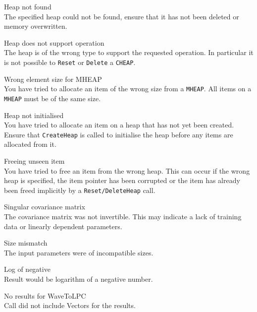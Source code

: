\begin{itemize}
\begin{itemize}
    Heap not found\\
        The specified heap could not be found, ensure that it has not been 
        deleted or memory overwritten.

    Heap does not support operation\\
        The heap is of the wrong type to support the requested operation.  In 
        particular it is not possible to \texttt{Reset} or \texttt{Delete} a
        \texttt{CHEAP}.

    Wrong element size for MHEAP\\
        You have tried to allocate an item of the wrong size from a 
        \texttt{MHEAP}. All items on a \texttt{MHEAP} must be of the same size.

    Heap not initialised\\
        You have tried to allocate an item on a heap that has not yet been 
        created.  Ensure that \texttt{CreateHeap} is called to initialise 
        the heap before any items are allocated from it.

    Freeing unseen item\\
        You have tried to free an item from the wrong heap.  This can occur
        if the wrong heap is specified, the item pointer has been corrupted 
        or the item has already been freed implicitly by a 
        \texttt{Reset/DeleteHeap} call.  

\end{itemize}
 
 
\begin{itemize}
    Singular covariance matrix\\
        The covariance matrix was not invertible.  This may indicate a lack
        of training data or linearly dependent parameters.

    Size mismatch\\
        The input parameters were of incompatible sizes.

    Log of negative\\
        Result would be logarithm of a negative number.

\end{itemize}


\begin{itemize}
    No results for WaveToLPC\\
        Call did not include Vectors for the results.


\end{itemize}
\end{itemize}

